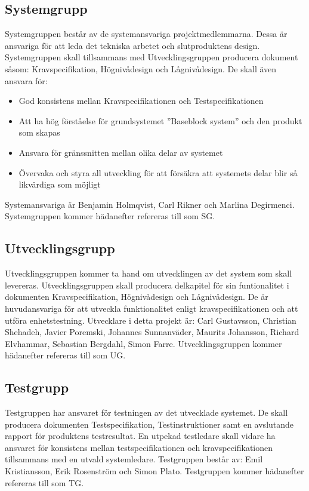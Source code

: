 \documentclass[paper=a4, fontsize=11pt,twoside]{article}
\begin{document}
\subsection*{Systemgrupp}
Systemgruppen består av de systemansvariga projektmedlemmarna. Dessa är ansvariga för att leda det tekniska arbetet och slutproduktens design. Systemgruppen skall tillsammans med Utvecklingsgruppen producera dokument såsom: Kravspecifikation, Högnivådesign och Lågnivådesign. 
De skall även ansvara för: 
\begin{itemize}
\item God konsistens mellan Kravspecifikationen och Testspecifikationen 
\item Att ha hög förståelse för grundsystemet ''Baseblock system'' och den produkt som skapas	 
\item Ansvara för gränssnitten mellan olika delar av systemet
\item Övervaka och styra all utveckling för att försäkra att systemets delar blir så likvärdiga som möjligt
\end{itemize}
Systemansvariga är Benjamin Holmqvist, Carl Rikner och Marlina Degirmenci. 
Systemgruppen kommer hädanefter refereras till som SG.

\subsection*{Utvecklingsgrupp}
Utvecklingsgruppen kommer ta hand om utvecklingen av det system som skall levereras. Utvecklingsgruppen skall producera delkapitel för sin funtionalitet i dokumenten Kravspecifikation, Högnivådesign och Lågnivådesign. De är huvudansvariga för att utveckla funktionalitet enligt kravspecifikationen och att utföra enhetstestning. Utvecklare i detta projekt är: Carl Gustavsson, Christian Shehadeh, Javier Poremski, Johannes Sunnanväder, Maurits Johansson, Richard Elvhammar, Sebastian Bergdahl, Simon Farre.
Utvecklingsgruppen kommer hädanefter refereras till som UG.

\subsection*{Testgrupp}
Testgruppen har ansvaret för testningen av det utvecklade systemet. De skall producera dokumenten Testspecifikation, Testinstruktioner samt en avslutande rapport för produktens testresultat. En utpekad testledare skall vidare ha ansvaret för konsistens mellan testspecifikationen och kravspecifikationen tillsammans med en utvald systemledare. Testgruppen består av: Emil Kristiansson, Erik Rosenström och Simon Plato.
Testgruppen kommer hädanefter refereras till som TG.
\end{document}
